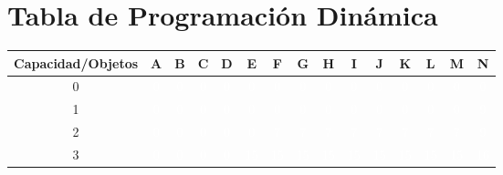 \documentclass{article}
\begin{document}
\section*{Tabla de Programación Dinámica}
\begin{center}
\scriptsize
\begin{tabular}{|c|c|c|c|c|c|c|c|c|c|c|c|c|c|c|}
\hline
Capacidad/Objetos & A & B & C & D & E & F & G & H & I & J & K & L & M & N \\ \hline
0 & \cellcolor{rojo}\textcolor{white}{0} & \cellcolor{rojo}\textcolor{white}{0} & \cellcolor{rojo}\textcolor{white}{0} & \cellcolor{rojo}\textcolor{white}{0} & \cellcolor{rojo}\textcolor{white}{0} & \cellcolor{rojo}\textcolor{white}{0} & \cellcolor{rojo}\textcolor{white}{0} & \cellcolor{rojo}\textcolor{white}{0} & \cellcolor{rojo}\textcolor{white}{0} & \cellcolor{rojo}\textcolor{white}{0} & \cellcolor{rojo}\textcolor{white}{0} & \cellcolor{rojo}\textcolor{white}{0} & \cellcolor{rojo}\textcolor{white}{0} & \cellcolor{rojo}\textcolor{white}{0} \\ \hline
1 & \cellcolor{rojo}\textcolor{white}{0} & \cellcolor{rojo}\textcolor{white}{0} & \cellcolor{rojo}\textcolor{white}{0} & \cellcolor{rojo}\textcolor{white}{0} & \cellcolor{rojo}\textcolor{white}{0} & \cellcolor{rojo}\textcolor{white}{0} & \cellcolor{rojo}\textcolor{white}{0} & \cellcolor{rojo}\textcolor{white}{0} & \cellcolor{rojo}\textcolor{white}{0} & \cellcolor{rojo}\textcolor{white}{0} & \cellcolor{rojo}\textcolor{white}{0} & \cellcolor{rojo}\textcolor{white}{0} & \cellcolor{rojo}\textcolor{white}{0} & \cellcolor{verde}\textcolor{white}{9} \\ \hline
2 & \cellcolor{rojo}\textcolor{white}{0} & \cellcolor{rojo}\textcolor{white}{0} & \cellcolor{rojo}\textcolor{white}{0} & \cellcolor{rojo}\textcolor{white}{0} & \cellcolor{rojo}\textcolor{white}{0} & \cellcolor{verde}\textcolor{white}{7} & \cellcolor{rojo}\textcolor{white}{7} & \cellcolor{rojo}\textcolor{white}{7} & \cellcolor{rojo}\textcolor{white}{7} & \cellcolor{rojo}\textcolor{white}{7} & \cellcolor{rojo}\textcolor{white}{7} & \cellcolor{rojo}\textcolor{white}{7} & \cellcolor{rojo}\textcolor{white}{7} & \cellcolor{verde}\textcolor{white}{9} \\ \hline
3 & \cellcolor{rojo}\textcolor{white}{0} & \cellcolor{rojo}\textcolor{white}{0} & \cellcolor{rojo}\textcolor{white}{0} & \cellcolor{rojo}\textcolor{white}{0} & \cellcolor{verde}\textcolor{white}{15} & \cellcolor{rojo}\textcolor{white}{15} & \cellcolor{rojo}\textcolor{white}{15} & \cellcolor{rojo}\textcolor{white}{15} & \cellcolor{rojo}\textcolor{white}{15} & \cellcolor{rojo}\textcolor{white}{15} & \cellcolor{rojo}\textcolor{white}{15} & \cellcolor{rojo}\textcolor{white}{15} & \cellcolor{rojo}\textcolor{white}{15} & \cellcolor{verde}\textcolor{white}{16} \\ \hline

\end{tabular}
\end{center}
\end{document}
